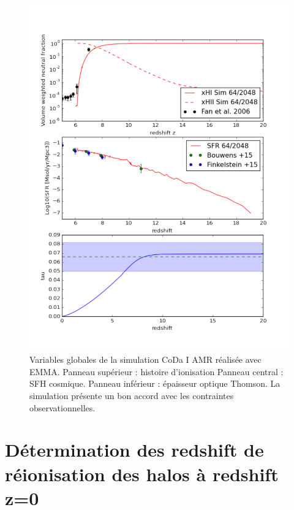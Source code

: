 
\begin{figure}
        \includegraphics[width=.95\linewidth]{img/05/x_sfr_tau.pdf} 
        \caption[Contraintes CoDa I AMR]{ Variables globales de la simulation \ac{CoDa} I \ac{AMR} réalisée avec EMMA.
        Panneau supérieur : histoire d'ionisation
		Panneau central : SFH cosmique.
        Panneau inférieur : épaisseur optique Thomson.
        La simulation présente un bon accord avec les contraintes observationnelles.
		\label{fig:presCODAEMMA}}
\end{figure}


\section{Détermination des redshift de réionisation des halos à redshift z=0}


